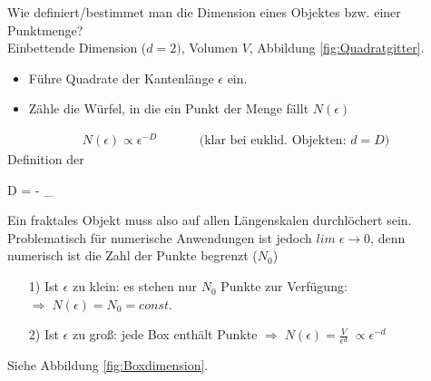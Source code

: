 \documentclass[12pt]{article}
\begin{document}
Wie definiert/bestimmet man die Dimension eines Objektes bzw. einer Punktmenge? \\ 
Einbettende Dimension ($d=2)$, Volumen $V$, Abbildung \ref{fig:Quadratgitter}. 
\begin{itemize}
\item Führe Quadrate der Kantenlänge $\epsilon$ ein.
\item Zähle die Würfel, in die ein Punkt der Menge fällt $N(\epsilon)$
\end{itemize}
\begin{align*}
N(\epsilon) \propto \epsilon ^{-D} \qquad \quad \text{ (klar bei euklid. Objekten: }d=D)
\end{align*}
Definition der
\begin{tcolorbox}[ams gather,title= Hausdorff-Dimension, colback=blue!10!white, colframe=blue!30!black] 
D = - \lim\limits_{\epsilon {}} 
\end{tcolorbox} Ein fraktales Objekt muss also auf allen Längenskalen durchlöchert sein. Problematisch für numerische Anwendungen ist jedoch $lim \; \epsilon \to 0$, denn numerisch ist die Zahl der Punkte begrenzt ($N_0$)
\begin{enumerate}
\item[1)] Ist $\epsilon$ zu klein: es stehen nur $N_0$ Punkte zur Verfügung: $\Rightarrow \; N(\epsilon) = N_0 = const.$
\item[2)] Ist $\epsilon$ zu groß: jede Box enthält Punkte $\Rightarrow \; N(\epsilon) = \frac{V}{\epsilon^d} \; \propto \epsilon^{-d}$
\end{enumerate}
Siehe Abbildung \ref{fig:Boxdimension}. \\
\end{document}

